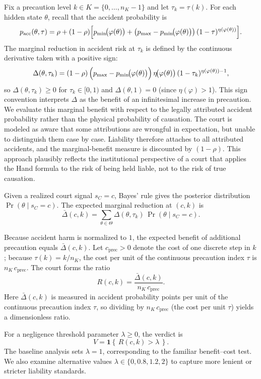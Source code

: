 \documentclass{article}
\begin{document}
Fix a precaution level $k\in K=\{0,\dots,n_K-1\}$ and let $\tau_k=\tau(k)$. For each hidden state $\theta$, recall that the accident probability is
\[
p_{\mathrm{acc}}(\theta,\tau)
=\rho+(1-\rho)\Bigl[p_{\min}\!\bigl(\varphi(\theta)\bigr)
+\bigl(p_{\max}-p_{\min}\!\bigl(\varphi(\theta)\bigr)\bigr)\,(1-\tau)^{\eta(\varphi(\theta))}\Bigr].
\]
The marginal reduction in accident risk at $\tau_k$ is defined by the continuous derivative taken with a positive sign:
\[
\Delta(\theta,\tau_k)
=(1-\rho)\,\Bigl(p_{\max}-p_{\min}\!\bigl(\varphi(\theta)\bigr)\Bigr)\,\eta\!\bigl(\varphi(\theta)\bigr)\,(1-\tau_k)^{\eta(\varphi(\theta))-1},
\]
so $\Delta(\theta,\tau_k)\ge 0$ for $\tau_k\in[0,1)$ and $\Delta(\theta,1)=0$ (since $\eta(\varphi)>1$). This sign convention interprets $\Delta$ as the benefit of an infinitesimal increase in precaution. We evaluate this marginal benefit with respect to the legally attributed accident probability rather than the physical probability of causation. The court is modeled as aware that some attributions are wrongful in expectation, but unable to distinguish them case by case. Liability therefore attaches to all attributed accidents, and the marginal-benefit measure is discounted by $(1-\rho)$. This approach plausibly reflects the institutional perspective of a court that applies the Hand formula to the risk of being held liable, not to the risk of true causation.

Given a realized court signal $s_C=c$, Bayes’ rule gives the posterior distribution $\Pr(\theta \mid s_C=c)$. The expected marginal reduction at $(c,k)$ is
\[
\bar{\Delta}(c,k)=\sum_{\theta\in\Theta}\Delta(\theta,\tau_k)\,\Pr(\theta\mid s_C=c).
\]

Because accident harm is normalized to $1$, the expected benefit of additional precaution equals $\bar{\Delta}(c,k)$. Let $c_{\mathrm{prec}}>0$ denote the cost of one discrete step in $k$; because $\tau(k)=k/n_K$, the cost per unit of the continuous precaution index $\tau$ is $n_K\,c_{\mathrm{prec}}$. The court forms the ratio
\[
R(c,k)=\frac{\bar{\Delta}(c,k)}{\,n_K\,c_{\mathrm{prec}}\,}.
\]
Here $\bar{\Delta}(c,k)$ is measured in accident probability points per unit of the continuous precaution index $\tau$, so dividing by $n_K\,c_{\mathrm{prec}}$ (the cost per unit $\tau$) yields a dimensionless ratio.

For a negligence threshold parameter $\lambda \ge 0$, the verdict is
\[
V=\mathbf{1}\!\left\{\,R(c,k)>\lambda\,\right\}.
\]
The baseline analysis sets $\lambda=1$, corresponding to the familiar benefit–cost test. We also examine alternative values $\lambda\in\{0,0.8,1.2,2\}$ to capture more lenient or stricter liability standards. 
\end{document}
